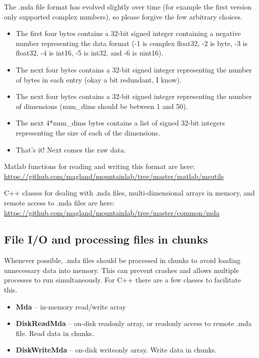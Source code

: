 \documentclass{article}
\begin{document}
The .mda file format has evolved slightly over time (for example the first version only supported complex numbers), so please forgive the few arbitrary choices.

\begin{itemize}
\item{The first four bytes contains a 32-bit signed integer containing a negative number representing the data format (-1 is complex float32, -2 is byte, -3 is float32, -4 is int16, -5 is int32, and -6 is uint16).}
\item{The next four bytes contains a 32-bit signed integer representing the number of bytes in each entry (okay a bit redundant, I know).}
\item{The next four bytes contains a 32-bit signed integer representing the number of dimensions (num\_dims should be between 1 and 50).}
\item{The next 4*num\_dims bytes contains a list of signed 32-bit integers representing the size of each of the dimensions.}
\item{That's it! Next comes the raw data.}
\end{itemize}

Matlab functions for reading and writing this format are here:
\url{https://github.com/magland/mountainlab/tree/master/matlab/msutils}

C++ classes for dealing with .mda files, multi-dimensional arrays in memory, and remote access to .mda files are here: \url{https://github.com/magland/mountainlab/tree/master/common/mda}

\subsection{File I/O and processing files in chunks}

Whenever possible, .mda files should be processed in chunks to avoid loading unnecessary data into memory. This can prevent crashes and allows multiple processes to run simultaneously. For C++ there are a few classes to facilitate this.

\begin{itemize}
\item{\textbf{Mda} -- in-memory read/write array}
\item{\textbf{DiskReadMda} -- on-disk readonly array, or readonly access to remote .mda file. Read data in chunks.}
\item{\textbf{DiskWriteMda} -- on-disk writeonly array. Write data in chunks.}
\end{itemize}
\end{document}

